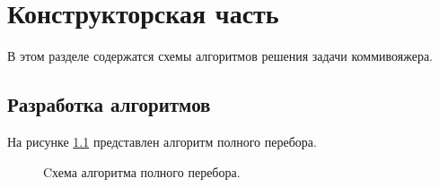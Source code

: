 \chapter{Конструкторская часть}
В этом разделе содержатся схемы алгоритмов решения задачи коммивояжера.
\section{Разработка алгоритмов}

На рисунке \ref{fig:mainBrute} представлен алгоритм полного перебора.
\begin{figure}[H]
	\caption{Cхема алгоритма полного перебора.}
	\label{fig:mainBrute}
\end{figure}
\newpage

